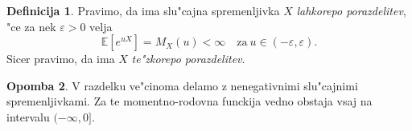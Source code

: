 \documentclass[12pt, a4paper, reqno]{amsart}
\theoremstyle{definition}
\newtheorem{definicija}{Definicija}[section]
\newtheorem{opomba}[definicija]{Opomba}
\theoremstyle{plain}
\newcommand{\E}{\mathbb{E}}
\newcommand{\1}{\mathds{1}}
\begin{document}
        \begin{definicija}
            Pravimo, da ima slu"cajna spremenljivka $X$ \textit{lahkorepo porazdelitev}, "ce za 
            nek $\varepsilon > 0$ velja
        \begin{equation*}
            \E\left[e^{uX}\right] = M_X(u) < \infty \quad \text{za} \ u \in (-\varepsilon, \varepsilon).
        \end{equation*}
        Sicer pravimo, 
        da ima $X$ \textit{te"zkorepo porazdelitev}.
        \label{def:lahkorepnaPorazdelitev}
        \end{definicija}

        \begin{opomba}
            V razdelku ve"cinoma delamo z nenegativnimi slu"cajnimi spremenljivkami. Za te momentno-rodovna 
            funckija vedno obstaja vsaj na intervalu $(-\infty, 0]$.
        \end{opomba}
\end{document}
